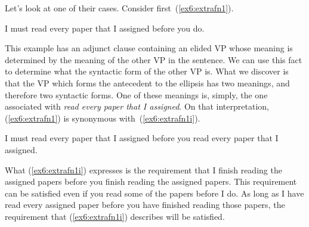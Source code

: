 Let's look at one of their cases. Consider first~(\ref{ex6:extrafn1}).
\begin{exe}
\raggedright
	\ex \label{ex6:extrafn1}
	I must read every paper that I assigned before you do.
\end{exe}
This example has an adjunct clause containing an elided VP whose meaning is determined by the meaning of the other VP in the sentence. We can use this fact to determine what the syntactic form of the other VP is. What we discover is that the VP which forms the antecedent to the ellipsis has two meanings, and therefore two syntactic forms. One of these meanings is, simply, the one associated with \emph{read every paper that I assigned}. On that interpretation, (\ref{ex6:extrafn1}) is synonymous with~(\ref{ex6:extrafn1i}).
\begin{exe}
\raggedright
	\ex \label{ex6:extrafn1i}
	I must read every paper that I assigned before you read every paper that I assigned.
\end{exe}
What (\ref{ex6:extrafn1i}) expresses is the requirement that I finish reading the assigned papers before you finish reading the assigned papers. This requirement can be satisfied even if you read some of the papers before I do. As long as I have read every assigned paper before you have finished reading those papers, the requirement that (\ref{ex6:extrafn1i}) describes will be satisfied.
\pagebreak

